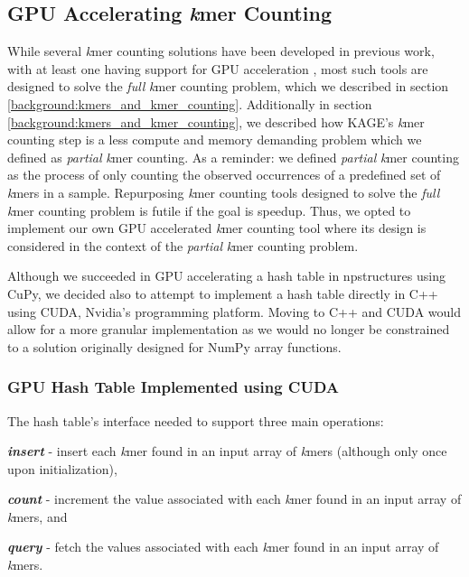 \subsection{GPU Accelerating \textit{k}mer Counting} \label{methods:gpu_accelerating_kmer_counting}
While several \textit{k}mer counting solutions have been developed in previous work, with at least one having support for GPU acceleration \cite{kmer_counting_tools}, most such tools are designed to solve the \textit{full} \textit{k}mer counting problem, which we described in section \ref{background:kmers_and_kmer_counting}.
Additionally in section \ref{background:kmers_and_kmer_counting}, we described how KAGE's \textit{k}mer counting step is a less compute and memory demanding problem which we defined as \textit{partial} \textit{k}mer counting.
As a reminder: we defined \textit{partial} \textit{k}mer counting as the process of only counting the observed occurrences of a predefined set of \textit{k}mers in a sample.
Repurposing \textit{k}mer counting tools designed to solve the \textit{full} \textit{k}mer counting problem is futile if the goal is speedup.
Thus, we opted to implement our own GPU accelerated \textit{k}mer counting tool where its design is considered in the context of the \textit{partial} \textit{k}mer counting problem.

Although we succeeded in GPU accelerating a hash table in npstructures using CuPy, we decided also to attempt to implement a hash table directly in C++ using CUDA, Nvidia's programming platform.
Moving to C++ and CUDA would allow for a more granular implementation as we would no longer be constrained to a solution originally designed for NumPy array functions.

\subsubsection{GPU Hash Table Implemented using CUDA}
The hash table's interface needed to support three main operations: 
\begin{compactitem}
  \item
    \textbf{\textit{insert}} - insert each \textit{k}mer found in an input array of \textit{k}mers (although only once upon initialization),
  \item
    \textbf{\textit{count}} - increment the value associated with each \textit{k}mer found in an input array of \textit{k}mers, and
  \item
    \textbf{\textit{query}} - fetch the values associated with each \textit{k}mer found in an input array of \textit{k}mers.
\end{compactitem}


